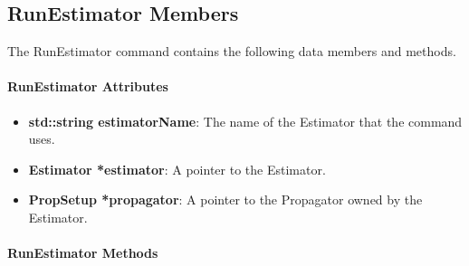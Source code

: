 \subsection{RunEstimator Members}

The RunEstimator command contains the following data members and methods.

\paragraph{RunEstimator Attributes}

\begin{itemize}
\item \textbf{std::string estimatorName}:  The name of the Estimator that the command uses.
\item \textbf{Estimator *estimator}: A pointer to the Estimator.
\item \textbf{PropSetup *propagator}:  A pointer to the Propagator owned by the Estimator.
\end{itemize}

\paragraph{RunEstimator Methods}

